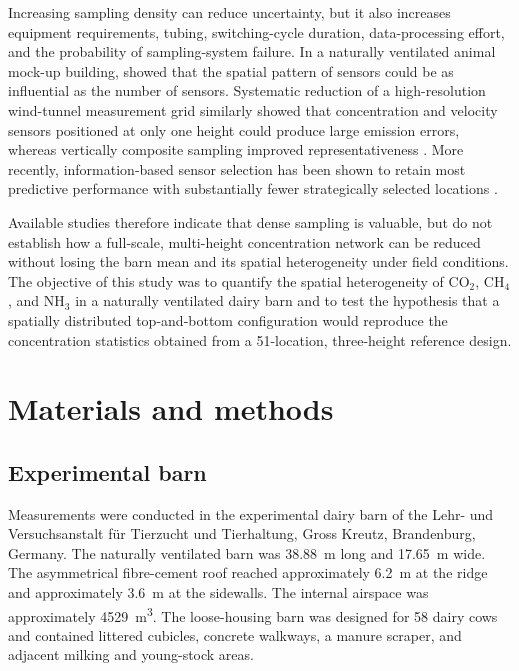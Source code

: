 \documentclass[12pt,a4paper]{article}
\begin{document}
Increasing sampling density can reduce uncertainty, but it also increases
equipment requirements, tubing, switching-cycle duration, data-processing
effort, and the probability of sampling-system failure. In a naturally
ventilated animal mock-up building, \citet{DeVogeleer2017} showed that the
spatial pattern of sensors could be as influential as the number of sensors.
Systematic reduction of a high-resolution wind-tunnel measurement grid
similarly showed that concentration and velocity sensors positioned at only
one height could produce large emission errors, whereas vertically composite
sampling improved representativeness \citep{Janke2020}. More recently,
information-based sensor selection has been shown to retain most predictive
performance with substantially fewer strategically selected locations
\citep{Chen2026}.

Available studies therefore indicate that dense sampling is valuable, but do
not establish how a full-scale, multi-height concentration network can be
reduced without losing the barn mean and its spatial heterogeneity under field
conditions. The objective of this study was to quantify the spatial
heterogeneity of \(\mathrm{CO_2}\), \(\mathrm{CH_4}\), and
\(\mathrm{NH_3}\) in a naturally ventilated dairy barn and to test the
hypothesis that a spatially distributed top-and-bottom configuration would
reproduce the concentration statistics obtained from a 51-location,
three-height reference design.

\section{Materials and methods}

\subsection{Experimental barn}

Measurements were conducted in the experimental dairy barn of the
Lehr- und Versuchsanstalt f\"ur Tierzucht und Tierhaltung, Gross Kreutz,
Brandenburg, Germany. The naturally ventilated barn was \SI{38.88}{m} long and
\SI{17.65}{m} wide. The asymmetrical fibre-cement roof reached approximately
\SI{6.2}{m} at the ridge and approximately \SI{3.6}{m} at the sidewalls. The
internal airspace was approximately \SI{4529}{m^3}. The loose-housing barn was
designed for 58 dairy cows and contained littered cubicles, concrete
walkways, a manure scraper, and adjacent milking and young-stock areas.
\end{document}
